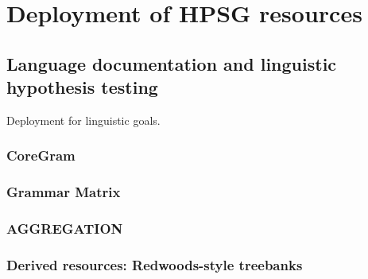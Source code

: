 \documentclass[output=paper,nonflat]{langsci/langscibook}
\begin{document}





\section{Deployment of HPSG resources}
\label{cl:deployment}

\subsection{Language documentation and linguistic hypothesis testing}
\label{cl:lang-doc}

Deployment for linguistic goals.


\subsubsection{CoreGram}

\subsubsection{Grammar Matrix}

\subsubsection{AGGREGATION}

\subsubsection{Derived resources: Redwoods-style treebanks}
\end{document}
